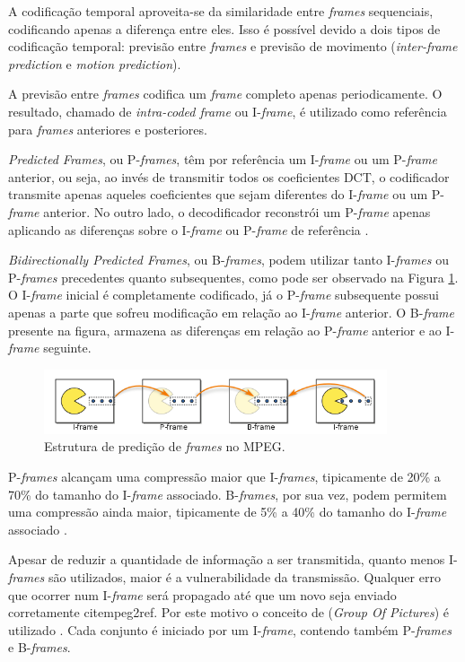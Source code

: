 A codificação temporal aproveita-se da similaridade entre \emph{frames} sequenciais, codificando apenas a diferença entre eles. Isso é possível devido a dois tipos de codificação temporal: previsão entre \emph{frames} e previsão de movimento (\emph{inter-frame prediction} e \emph{motion prediction}).

A previsão entre \emph{frames} codifica um \emph{frame} completo apenas periodicamente. O resultado, chamado de \emph{intra-coded frame} ou I-\emph{frame}, é utilizado como referência para \emph{frames} anteriores e posteriores.

\emph{Predicted Frames}, ou P-\emph{frames}, têm por referência um I-\emph{frame} ou um P-\emph{frame} anterior, ou seja, ao invés de transmitir todos os coeficientes DCT, o codificador transmite apenas aqueles coeficientes que sejam diferentes do I-\emph{frame} ou um P-\emph{frame} anterior. No outro lado, o decodificador reconstrói um P-\emph{frame} apenas aplicando as diferenças sobre o I-\emph{frame} ou P-\emph{frame} de referência \cite{mpeg2ref}.

\emph{Bidirectionally Predicted Frames}, ou B-\emph{frames}, podem utilizar tanto I-\emph{frames} ou P-\emph{frames} precedentes quanto subsequentes, como pode ser observado na Figura \ref{fig:ipbframes}. O I-\emph{frame} inicial é completamente codificado, já o P-\emph{frame} subsequente possui apenas a parte que sofreu modificação em relação ao I-\emph{frame} anterior. O B-\emph{frame} presente na figura, armazena as diferenças em relação ao P-\emph{frame} anterior e ao I-\emph{frame} seguinte.

\begin{figure}[!htb]
	\centering
	\includegraphics[width=0.9\textwidth]{./imgs/ipbframes.png}
	\caption{Estrutura de predição de \emph{frames} no MPEG.}
	\label{fig:ipbframes}
\end{figure}

P-\emph{frames} alcançam uma compressão maior que I-\emph{frames}, tipicamente de 20\% a 70\% do tamanho do I-\emph{frame} associado. B-\emph{frames}, por sua vez, podem permitem uma compressão ainda maior, tipicamente de 5\% a 40\% do tamanho do I-\emph{frame} associado \cite{ciscoieee}.

Apesar de reduzir a quantidade de informação a ser transmitida, quanto menos I-\emph{frames} são utilizados, maior é a vulnerabilidade da transmissão. Qualquer erro que ocorrer num I-\emph{frame} será propagado até que um novo seja enviado corretamente  cite{mpeg2ref}. Por este motivo o conceito de  (\emph{Group Of Pictures}) é utilizado \cite{mpeg2ref}. Cada conjunto é iniciado por um I-\emph{frame}, contendo também P-\emph{frames} e B-\emph{frames}.

